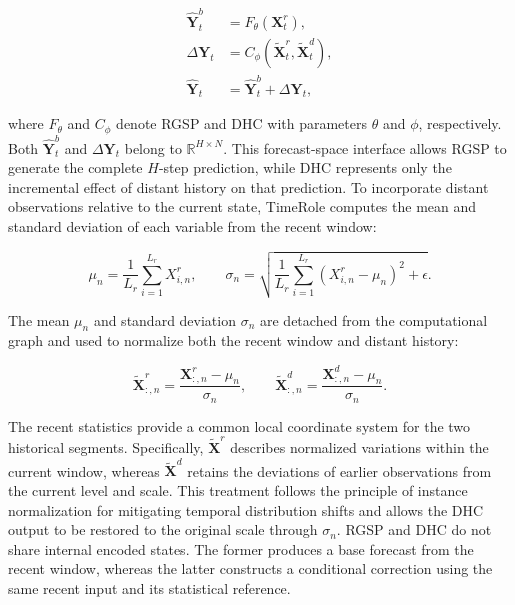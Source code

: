 \begin{equation}
\begin{aligned}
\widehat{\mathbf{Y}}^{b}_{t}
&=F_{\theta}(\mathbf{X}^{r}_{t}),\\
\Delta\mathbf{Y}_{t}
&=C_{\phi}(\widetilde{\mathbf{X}}^{r}_{t},
\widetilde{\mathbf{X}}^{d}_{t}),\\
\widehat{\mathbf{Y}}_{t}
&=\widehat{\mathbf{Y}}^{b}_{t}+\Delta\mathbf{Y}_{t},
\end{aligned}
\label{eq:timerole-overview}
\end{equation}

where \(F_{\theta}\) and \(C_{\phi}\) denote RGSP and DHC with parameters \(\theta\) and \(\phi\), respectively. Both \(\widehat{\mathbf{Y}}^{b}_{t}\) and \(\Delta\mathbf{Y}_{t}\) belong to \(\mathbb R^{H\times N}\). This forecast-space interface allows RGSP to generate the complete \(H\)-step prediction, while DHC represents only the incremental effect of distant history on that prediction. To incorporate distant observations relative to the current state, TimeRole computes the mean and standard deviation of each variable from the recent window:

\begin{equation}
\mu_n=\frac{1}{L_r}\sum_{i=1}^{L_r}X^{r}_{i,n},\qquad
\sigma_n=\sqrt{
\frac{1}{L_r}\sum_{i=1}^{L_r}(X^{r}_{i,n}-\mu_n)^2+\epsilon}.
\label{eq:recent-statistics}
\end{equation}

The mean \(\mu_n\) and standard deviation \(\sigma_n\) are detached from the computational graph and used to normalize both the recent window and distant history:

\begin{equation}
\widetilde{\mathbf{X}}^{r}_{:,n}
=\frac{\mathbf{X}^{r}_{:,n}-\mu_n}{\sigma_n},\qquad
\widetilde{\mathbf{X}}^{d}_{:,n}
=\frac{\mathbf{X}^{d}_{:,n}-\mu_n}{\sigma_n}.
\label{eq:shared-normalization}
\end{equation}

The recent statistics provide a common local coordinate system for the two historical segments. Specifically, \(\widetilde{\mathbf{X}}^{r}\) describes normalized variations within the current window, whereas \(\widetilde{\mathbf{X}}^{d}\) retains the deviations of earlier observations from the current level and scale. This treatment follows the principle of instance normalization for mitigating temporal distribution shifts \citep{Kim2022RevIN} and allows the DHC output to be restored to the original scale through \(\sigma_n\). RGSP and DHC do not share internal encoded states. The former produces a base forecast from the recent window, whereas the latter constructs a conditional correction using the same recent input and its statistical reference.

